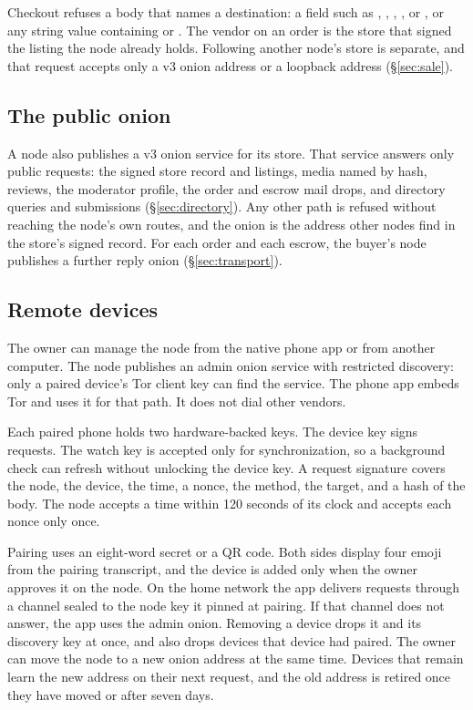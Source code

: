 Checkout refuses a body that names a destination: a field such as , , , , or , or any string value containing \code{://} or . The vendor on an order is the store that signed the listing the node already holds. Following another node's store is separate, and that request accepts only a v3 onion address or a loopback address (\S\ref{sec:sale}).

\subsection{The public onion}
\label{sec:public-onion}

A node also publishes a v3 onion service for its store. That service answers only public requests: the signed store record and listings, media named by hash, reviews, the moderator profile, the order and escrow mail drops, and directory queries and submissions (\S\ref{sec:directory}). Any other path is refused without reaching the node's own routes, and the onion is the address other nodes find in the store's signed record. For each order and each escrow, the buyer's node publishes a further reply onion (\S\ref{sec:transport}).

\subsection{Remote devices}
\label{sec:remote}

The owner can manage the node from the native phone app or from another computer. The node publishes an admin onion service with restricted discovery: only a paired device's Tor client key can find the service. The phone app embeds Tor and uses it for that path. It does not dial other vendors.

Each paired phone holds two hardware-backed keys. The device key signs requests. The watch key is accepted only for synchronization, so a background check can refresh without unlocking the device key. A request signature covers the node, the device, the time, a nonce, the method, the target, and a hash of the body. The node accepts a time within 120 seconds of its clock and accepts each nonce only once.

Pairing uses an eight-word secret or a QR code. Both sides display four emoji from the pairing transcript, and the device is added only when the owner approves it on the node. On the home network the app delivers requests through a channel sealed to the node key it pinned at pairing. If that channel does not answer, the app uses the admin onion. Removing a device drops it and its discovery key at once, and also drops devices that device had paired. The owner can move the node to a new onion address at the same time. Devices that remain learn the new address on their next request, and the old address is retired once they have moved or after seven days.

